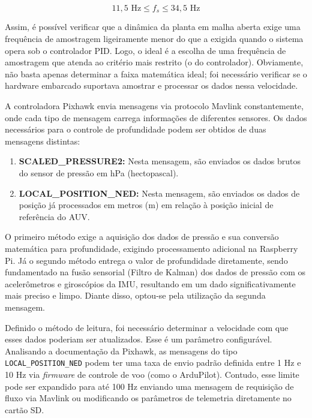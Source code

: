 \documentclass[12pt, a4paper]{article}
\begin{document}
			\begin{equation}
				11{,}5 \text{ Hz} \le f_s \le 34{,}5 \text{ Hz}
			\end{equation}

			Assim, é possível verificar que a dinâmica da planta em malha aberta exige uma frequência de amostragem ligeiramente menor do que a exigida quando o sistema opera sob o controlador PID. Logo, o ideal é a escolha de uma frequência de amostragem que atenda ao critério mais restrito (o do controlador). Obviamente, não basta apenas determinar a faixa matemática ideal; foi necessário verificar se o hardware embarcado suportava amostrar e processar os dados nessa velocidade.
			
			A controladora Pixhawk envia mensagens via protocolo Mavlink constantemente, onde cada tipo de mensagem carrega informações de diferentes sensores. Os dados necessários para o controle de profundidade podem ser obtidos de duas mensagens distintas:

			\begin{enumerate}
				\item \textbf{SCALED\_PRESSURE2:} Nesta mensagem, são enviados os dados brutos do sensor de pressão em hPa (hectopascal).
				\item \textbf{LOCAL\_POSITION\_NED:} Nesta mensagem, são enviados os dados de posição já processados em metros (m) em relação à posição inicial de referência do AUV.
			\end{enumerate}

			O primeiro método exige a aquisição dos dados de pressão e sua conversão matemática para profundidade, exigindo processamento adicional na Raspberry Pi. Já o segundo método entrega o valor de profundidade diretamente, sendo fundamentado na fusão sensorial (Filtro de Kalman) dos dados de pressão com os acelerômetros e giroscópios da IMU, resultando em um dado significativamente mais preciso e limpo. Diante disso, optou-se pela utilização da segunda mensagem. 

			Definido o método de leitura, foi necessário determinar a velocidade com que esses dados poderiam ser atualizados. Esse é um parâmetro configurável. Analisando a documentação da Pixhawk, as mensagens do tipo \texttt{LOCAL\_POSITION\_NED} podem ter uma taxa de envio padrão definida entre 1 Hz e 10 Hz via \textit{firmware} de controle de voo (como o ArduPilot). Contudo, esse limite pode ser expandido para até 100 Hz enviando uma mensagem de requisição de fluxo via Mavlink ou modificando os parâmetros de telemetria diretamente no cartão SD.
\end{document}
